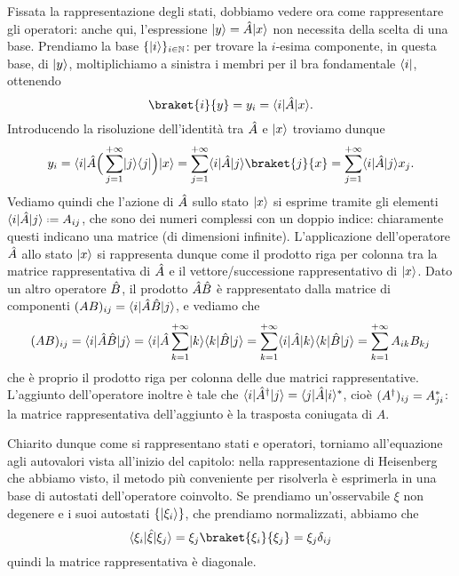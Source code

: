 Fissata la rappresentazione degli stati, dobbiamo vedere ora come rappresentare gli operatori: anche qui, l'espressione $\lvert y\rangle=\hat{A}\lvert x\rangle$ non necessita della scelta di una base.
Prendiamo la base $\{\lvert i\rangle\}_{i\in\mathbb{N}}$: per trovare la $i$-esima componente, in questa base, di $\lvert y\rangle$, moltiplichiamo a sinistra i membri per il bra fondamentale $\langle i\rvert$, ottenendo
\begin{equation}
	\braket{i}{y}=y_i=\bra{i}\op A\ket{x}.
\end{equation}
Introducendo la risoluzione dell'identità tra $\hat{A}$ e $\lvert x\rangle$ troviamo dunque
\begin{equation}
	y_i=\bra{i}\op A\Big(\sum_{j=1}^{+\infty}\ket{j}\bra{j}\Big)\ket{x}=\sum_{j=1}^{+\infty}\bra{i}\op A\ket{j}\braket{j}{x}=\sum_{j=1}^{+\infty}\bra{i}\op A\ket{j}x_j.
	\label{eq:rappresentazione-operatore-matrice}
\end{equation}
Vediamo quindi che l'azione di $\hat{A}$ sullo stato $\lvert x\rangle$ si esprime tramite gli elementi $\bra{i}\op A\ket{j}\defeq A_{ij}$, che sono dei numeri complessi con un doppio indice: chiaramente questi indicano una matrice (di dimensioni infinite). 
L'applicazione dell'operatore $\hat{A}$ allo stato $\lvert x\rangle$ si rappresenta dunque come il prodotto riga per colonna tra la matrice rappresentativa di $\hat{A}$ e il vettore/successione rappresentativo di $\lvert x\rangle$.
Dato un altro operatore $\hat{B}$, il prodotto $\hat{A}\hat{B}$ è rappresentato dalla matrice di componenti $(AB)_{ij}=\langle i\rvert\hat{A}\hat{B}\lvert j\rangle$, e vediamo che
\begin{equation}
	(AB)_{ij}=\langle i\rvert\hat{A}\hat{B}\lvert j\rangle=\langle i\rvert\hat{A}\sum_{k=1}^{+\infty}\lvert k\rangle\langle k\rvert\hat{B}\lvert j\rangle=\sum_{k=1}^{+\infty}\langle i\rvert\hat{A}\lvert k\rangle\langle k\rvert\hat{B}\lvert j\rangle=\sum_{k=1}^{+\infty}A_{ik}B_{kj}
	\label{eq:prodotto-operatori-matrici}
\end{equation}
che è proprio il prodotto riga per colonna delle due matrici rappresentative.
L'aggiunto dell'operatore inoltre è tale che $\langle i\rvert\hat{A}^\dagger\lvert j\rangle=\langle j\rvert\hat{A}\lvert i\rangle^*$, cioè $(A^\dagger)_{ij}=A_{ji}^*$: la matrice rappresentativa dell'aggiunto è la trasposta coniugata di $A$.

Chiarito dunque come si rappresentano stati e operatori, torniamo all'equazione agli autovalori vista all'inizio del capitolo: nella rappresentazione di Heisenberg che abbiamo visto, il metodo più conveniente per risolverla è esprimerla in una base di autostati dell'operatore coinvolto.
Se prendiamo un'osservabile $\xi$ non degenere e i suoi autostati $\{\lvert\xi_i\rangle\}$, che prendiamo normalizzati, abbiamo che
\begin{equation}
	\bra{\xi_i}\op\xi\ket{\xi_j}=\xi_j\braket{\xi_i}{\xi_j}=\xi_j\delta_{ij}
\end{equation}
quindi la matrice rappresentativa è diagonale.

